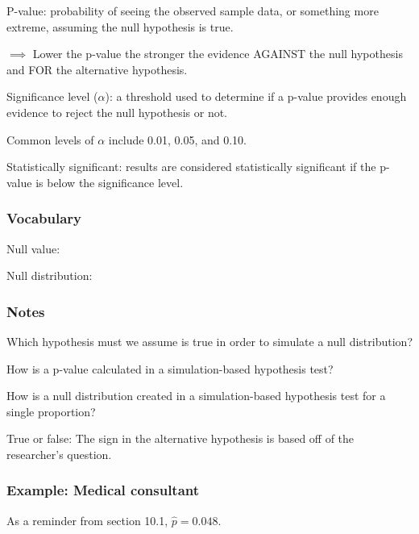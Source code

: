 \documentclass[
]{report}
\newcommand{\rgs}{\vspace{12pt}} %
\newcommand{\rgi}{\hspace{24pt}}  %
\begin{document}
P-value: probability of seeing the observed sample data, or something more extreme, assuming the null hypothesis is true.

\(\implies\) Lower the p-value the stronger the evidence AGAINST the null hypothesis and FOR the alternative hypothesis.

Significance level (\(\alpha\)): a threshold used to determine if a p-value provides enough evidence to reject the null hypothesis or not.

\rgi Common levels of \(\alpha\) include 0.01, 0.05, and 0.10.

Statistically significant: results are considered statistically significant if the p-value is below the significance level.

\hypertarget{vocabulary-11}{%
\subsubsection*{Vocabulary}\label{vocabulary-11}}

Null value:
\rgs

Null distribution:
\rgs

\hypertarget{notes-15}{%
\subsubsection*{Notes}\label{notes-15}}

Which hypothesis must we assume is true in order to simulate a null distribution?
\rgs

How is a p-value calculated in a simulation-based hypothesis test?
\rgs
\rgs

How is a null distribution created in a simulation-based hypothesis test for a single proportion?
\rgs
\rgs

True or false: The sign in the alternative hypothesis is based off of the researcher's question.

\hypertarget{example-medical-consultant-1}{%
\subsubsection*{Example: Medical consultant}\label{example-medical-consultant-1}}

As a reminder from section 10.1, \(\hat{p} = 0.048\).
\end{document}
